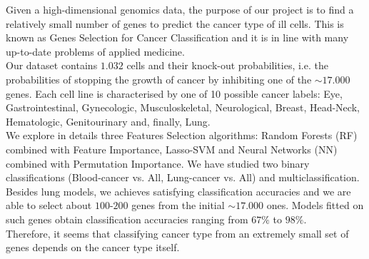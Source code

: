 \documentclass[a4paper,11pt, oneside]{article}  %
\begin{document}
Given a high-dimensional genomics data, the purpose of our project is to find a relatively small number of genes to predict the cancer type of ill cells. This is known as Genes Selection for Cancer Classification and it is in line with many up-to-date problems of applied medicine. \\
Our dataset contains $1.032$ cells and their knock-out probabilities, i.e. the probabilities of stopping the growth of cancer by inhibiting one of the $\sim 17.000$ genes. Each cell line is characterised by one of 10 possible cancer labels: Eye, Gastrointestinal, Gynecologic,  Musculoskeletal, Neurological, Breast, Head-Neck, Hematologic, Genitourinary and, finally, Lung. \\
We explore in details three Features Selection algorithms: Random Forests (RF) combined with Feature Importance, Lasso-SVM and Neural Networks (NN) combined with Permutation Importance. We have studied two binary classifications (Blood-cancer vs. All, Lung-cancer vs. All) and multiclassification. Besides lung models, we achieves satisfying classification accuracies and we are able to select about $100$-$200$ genes from the initial $\sim 17.000$ ones. Models fitted on such genes obtain classification accuracies ranging from $67\%$ to $98\%$. \\ 
Therefore, it seems that classifying cancer type from an extremely small set of genes depends on the cancer type itself. 
\end{document}
